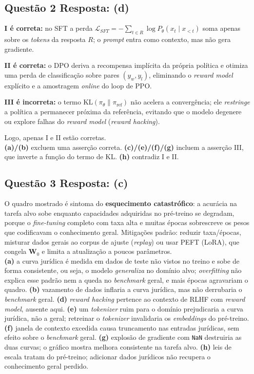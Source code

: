 \documentclass[11pt,a4paper]{article}
\begin{document}
\subsection*{Questão 2 \textemdash{} Resposta: (d)}
\textbf{I é correta:} no SFT a perda $\mathcal{L}_{SFT} = -\sum_{t \in R} \log P_\theta(x_t \mid x_{<t})$ soma apenas sobre os \textit{tokens} da resposta $R$; o \textit{prompt} entra como contexto, mas não gera gradiente.

\textbf{II é correta:} o DPO deriva a recompensa implícita da própria política e otimiza uma perda de classificação sobre pares $(y_w, y_l)$, eliminando o \textit{reward model} explícito e a amostragem \textit{online} do loop de PPO.

\textbf{III é incorreta:} o termo $\mathrm{KL}(\pi_\theta \| \pi_{\text{ref}})$ não acelera a convergência; ele \emph{restringe} a política a permanecer próxima da referência, evitando que o modelo degenere ou explore falhas do \textit{reward model} (\textit{reward hacking}).

Logo, apenas I e II estão corretas.\\
\textbf{(a)/(b)} excluem uma asserção correta.
\textbf{(c)/(e)/(f)/(g)} incluem a asserção III, que inverte a função do termo de KL.
\textbf{(h)} contradiz I e II.

\subsection*{Questão 3 \textemdash{} Resposta: (c)}
O quadro mostrado é sintoma do \textbf{esquecimento catastrófico}: a acurácia na tarefa alvo sobe enquanto capacidades adquiridas no pré-treino se degradam, porque o \textit{fine-tuning} completo com taxa alta e muitas épocas sobrescreve os pesos que codificavam o conhecimento geral. Mitigações padrão: reduzir taxa/épocas, misturar dados gerais ao corpus de ajuste (\textit{replay}) ou usar PEFT (LoRA), que congela $\mathbf{W}_0$ e limita a atualização a poucos parâmetros.\\
\textbf{(a)} a curva jurídica é medida em dados de teste não vistos no treino e sobe de forma consistente, ou seja, o modelo \emph{generaliza} no domínio alvo; \textit{overfitting} não explica esse padrão nem a queda no \textit{benchmark} geral, e mais épocas agravariam o quadro.
\textbf{(b)} vazamento de dados inflaria a curva jurídica, mas não derrubaria o \textit{benchmark} geral.
\textbf{(d)} \textit{reward hacking} pertence ao contexto de RLHF com \textit{reward model}, ausente aqui.
\textbf{(e)} um \textit{tokenizer} ruim para o domínio prejudicaria a curva jurídica, não a geral; retreinar o \textit{tokenizer} invalidaria os \textit{embeddings} do pré-treino.
\textbf{(f)} janela de contexto excedida causa truncamento nas entradas jurídicas, sem efeito sobre o \textit{benchmark} geral.
\textbf{(g)} explosão de gradiente com \texttt{NaN} destruiria as duas curvas; o gráfico mostra melhora consistente na tarefa alvo.
\textbf{(h)} leis de escala tratam do pré-treino; adicionar dados jurídicos não recupera o conhecimento geral perdido.
\end{document}
